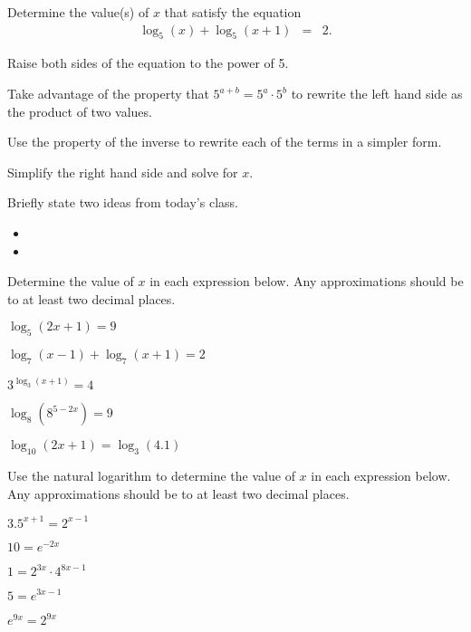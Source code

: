 \begin{problem}
\clearpage

\item Determine the value(s) of $x$ that satisfy the equation
  \begin{eqnarray*}
    \log_5(x) + \log_5(x+1) & = & 2.
  \end{eqnarray*}

  \begin{subproblem}
  \item Raise both sides of the equation to the power of 5. 
    \vfill
  \item Take advantage of the property that $5^{a+b}=5^a\cdot 5^b$ to
    rewrite the left hand side as the product of two values.
    \vfill
  \item Use the property of the inverse to rewrite each of the terms
    in a simpler form.
    \vfill
  \item Simplify the right hand side and solve for $x$.
    \vfill
  \end{subproblem}

\end{problem}

\postClass

\begin{problem}
\item Briefly state two ideas from today's class.
  \begin{itemize}
  \item
  \item
  \end{itemize}
\item Determine the value of $x$ in each expression below. Any
  approximations should be to at least two decimal places.
  \begin{subproblem}
    \item $\log_5(2x+1) = 9$
    \item $\log_{7}(x-1) + \log_{7}(x+1) = 2$
    \item $3^{\log_3(x+1)} = 4$
    \item $\log_8\left(8^{5-2x}\right) = 9$
    \item $\log_{10}(2x+1) = \log_3(4.1)$
  \end{subproblem}
\item Use the natural logarithm to determine the value of $x$ in each
  expression below. Any approximations should be to at least two
  decimal places.
  \begin{subproblem}
  \item $3.5^{x+1}=2^{x-1}$
  \item $10=e^{-2x}$
  \item $1=2^{3x}\cdot 4^{8x-1}$
  \item $5=e^{3x-1}$
  \item $e^{9x} = 2^{9x}$
  \end{subproblem}
\end{problem}


